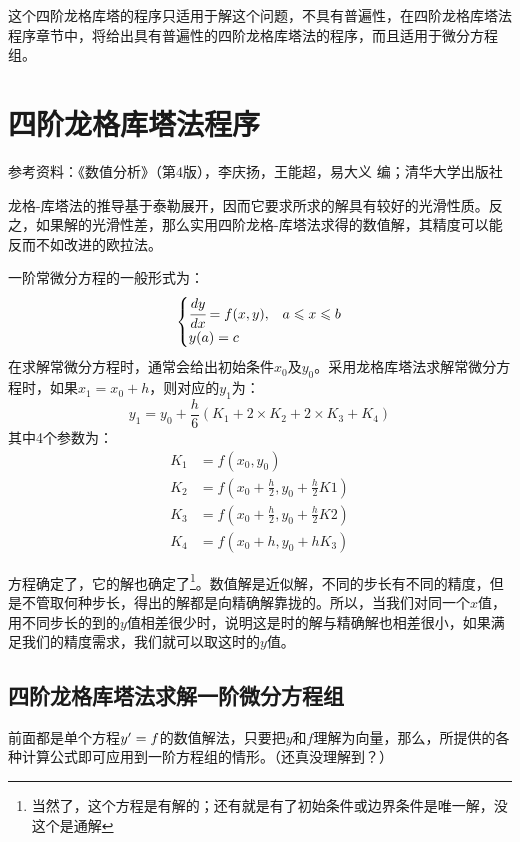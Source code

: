 这个四阶龙格库塔的程序只适用于解这个问题，不具有普遍性，在四阶龙格库塔法程序章节中，将给出具有普遍性的四阶龙格库塔法的程序，而且适用于微分方程组。



\section{四阶龙格库塔法程序}

参考资料：《数值分析》（第4版），李庆扬，王能超，易大义 编；清华大学出版社


龙格-库塔法的推导基于泰勒展开，因而它要求所求的解具有较好的光滑性质。反之，如果解的光滑性差，那么实用四阶龙格-库塔法求得的数值解，其精度可以能反而不如改进的欧拉法。

一阶常微分方程的一般形式为：
$$\begin{cases}\cfrac{dy}{dx}=f(x,y),&a\le x\le b\\
y(a)=c &\end{cases}$$
在求解常微分方程时，通常会给出初始条件$x_0$及$y_0$。采用龙格库塔法求解常微分方程时，如果$x_1=x_0+h$，则对应的$y_1$为：
$$y_1=y_0+\frac{h}{6}(K_1+2\times K_2 +2\times K_3 + K_4)$$
其中4个参数为：
\begin{align*}
K_1&=f(x_0,y_0)\\
K_2&=f(x_0+\frac{h}{2},y_0+\frac{h}{2}K1)\\
K_3&=f(x_0+\frac{h}{2},y_0+\frac{h}{2}K2)\\
K_4&=f(x_0+h,y_0+hK_3)
\end{align*}

方程确定了，它的解也确定了\footnote{当然了，这个方程是有解的；还有就是有了初始条件或边界条件是唯一解，没这个是通解}。数值解是近似解，不同的步长有不同的精度，但是不管取何种步长，得出的解都是向精确解靠拢的。所以，当我们对同一个$x$值，用不同步长的到的$y$值相差很少时，说明这是时的解与精确解也相差很小，如果满足我们的精度需求，我们就可以取这时的$y$值。



\subsection{四阶龙格库塔法求解一阶微分方程组}

前面都是单个方程$y\rq{}=f$的数值解法，只要把$y$和$f$理解为向量，那么，所提供的各种计算公式即可应用到一阶方程组的情形。（还真没理解到？）

